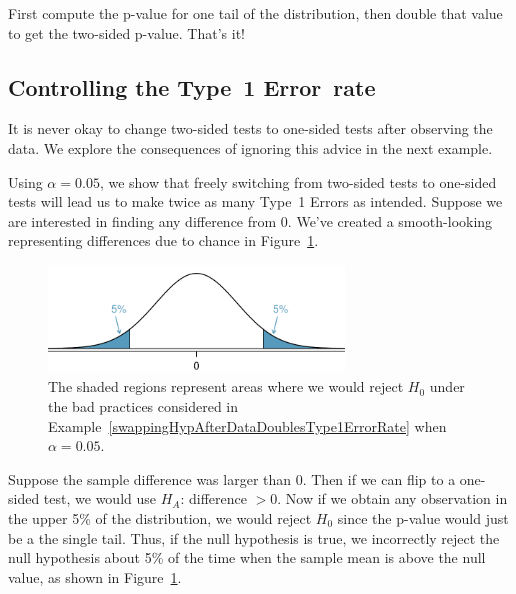 \begin{termBox}{
First compute the p-value for one tail of the distribution, then double that value to get the two-sided p-value. That's it!}
\end{termBox}


\subsection{Controlling the Type~1 Error~rate}
\label{InflatingType1ErrorRate}

It is never okay to change two-sided tests to one-sided tests after observing the data. We explore the consequences of ignoring this advice in the next example.

\begin{example}{Using $\alpha=0.05$, we show that freely switching from two-sided tests to one-sided tests will lead us to make twice as many Type~1 Errors as intended.} \label{swappingHypAfterDataDoublesType1ErrorRate}
Suppose we are interested in finding any difference from 0. We've created a smooth-looking  representing differences due to chance in Figure~\ref{type1ErrorDoublingExampleFigure}.

\begin{figure}[h]
\centering
\includegraphics[width=0.7\textwidth]{05/figures/type1ErrorDoublingExampleFigure/type1ErrorDoublingExampleFigure}
\caption{The shaded regions represent areas where we would reject $H_0$ under the bad practices considered in Example~\ref{swappingHypAfterDataDoublesType1ErrorRate} when $\alpha = 0.05$.}
\label{type1ErrorDoublingExampleFigure}
\end{figure}

Suppose the sample difference was larger than 0. Then if we can flip to a one-sided test, we would use $H_A$: difference $> 0$. Now if we obtain any observation in the upper 5\% of the distribution, we would reject $H_0$ since the p-value would just be a the single tail. Thus, if the null hypothesis is true, we incorrectly reject the null hypothesis about 5\% of the time when the sample mean is above the null value, as shown in Figure~\ref{type1ErrorDoublingExampleFigure}.


\end{example}
